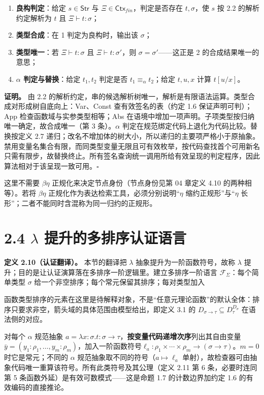 \documentclass[UTF8,a4paper,zihao=-4,fontset=windows,openany]{ctexbook}
\newcommand{\mcsdisplay}[1]{%
  \par\addvspace{0.7em}%
  \sbox{\mcsmathbox}{\ensuremath{\displaystyle #1}}%
  \ifdim\wd\mcsmathbox>\linewidth
    \noindent\resizebox{\linewidth}{!}{\usebox{\mcsmathbox}}%
  \else
    \noindent\hspace*{\fill}\usebox{\mcsmathbox}\hspace*{\fill}%
  \fi
  \par\addvspace{0.7em}%
}
\def\ensuremath#1{#1}%
\def\operatorname#1{#1}%
\def\mathrm#1{#1}%
\begin{document}
\begin{enumerate}
\item \textbf{良构判定}：给定 \(s\in\mathsf{Str}\) 与 \(\Xi\in\mathsf{Ctx}_{\mathrm{fin}}\)，判定是否存在 \(t,\sigma\)，使 \(s\) 按 2.2 的解析约定解析为 \(t\) 且 \(\Xi\vdash t:\sigma\)；
\item \textbf{类型合成}：在 1 判定为良构时，输出该 \(\sigma\)；
\item \textbf{类型唯一}：若 \(\Xi\vdash t:\sigma\) 且 \(\Xi\vdash t:\sigma'\)，则 \(\sigma=\sigma'\)——这正是 2 的合成结果唯一的意思；
\item \textbf{\(\alpha\) 判定与替换}：给定 \(t_1,t_2\) 判定是否 \(t_1\equiv_\alpha t_2\)；给定 \(t,u,x\) 计算 \(t[u/x]\)。
\end{enumerate}
\textbf{证明。} 由 2.2 的解析约定，串的候选解析树唯一，解析是有限语法运算。类型合成对形成树自底向上：Var、Const 查有效签名的表（约定 1.6 保证声明可判）；App 检查函数域与实参类型相等；Abs 在语境中增加一项声明。子项类型按归纳唯一确定，故合成唯一（第 3 条）。\(\alpha\) 判定在规范绑定代码上退化为代码比较。替换按定义 2.7 递归；改名不增加体的树大小，所以递归的主要项严格小于原抽象。禁用变量名集合有限，而同类型变量无限且可有效枚举，按代码查找首个可用新名只需有限步，故替换终止。所有签名查询统一调用所给有效呈现的判定程序，因此算法相对于该呈现一致可用。\(\square\)

这里不需要 \(\beta\eta\) 正规化来决定节点身份（节点身份见第 04 章定义 4.10 的两种相等）。若将 \(\beta\eta\) 正规化作为表达检索工具，必须分别说明\(“\eta\) 缩约正规形”与\(“\eta\) 长形”；二者不能同时含混称为同一归约的正规形。

\section{2.4 \(\lambda\) 提升的多排序认证语言}
\textbf{定义 2.10（认证翻译）。} 本节的翻译把 \(\lambda\) 抽象提升为一阶函数符号，故称 \(\lambda\) 提升；目的是让认证演算落在多排序一阶逻辑里。建立多排序一阶语言 \(\mathcal F_\Sigma\)：每个简单类型 \(\sigma\) 给一个非空排序；每个常元保留其排序；每对类型加入


\mcsdisplay{\operatorname{app}_{\sigma,\tau}:
(\sigma\to\tau)\times\sigma\longrightarrow\tau .}
\noindent 函数类型排序的元素在这里是待解释对象，不是“任意元理论函数”的默认全体：排序只要求非空，箭头域的具体范围由模型给出，即定义 3.1 的 \(D_{\sigma\to\tau}\subseteq D_\tau^{D_\sigma}\) 在语法侧的对应。

对每个 \(\alpha\) 规范抽象 \(a=\lambda x:\sigma.t:\sigma\to\tau\)，\textbf{按变量代码递增次序}列出其自由变量\(\bar y=(y_1:\rho_1,\ldots,y_m:\rho_m)\)，加入一阶函数符号\(\ell_a:\rho_1\times\cdots\times\rho_m\to(\sigma\to\tau)\)。\(m=0\) 时它是常元；不同的 \(\alpha\) 规范抽象取不同的符号（\(a\mapsto\ell_a\) 单射），故检查器可由抽象代码唯一重算该符号。所有此类符号及其公理（定义 2.11 第 6 条，必要时连同第 5 条函数外延）是有效可数模式——这是命题 1.7 的计数边界加约定 1.6 的有效编码的直接推论。
\end{document}
